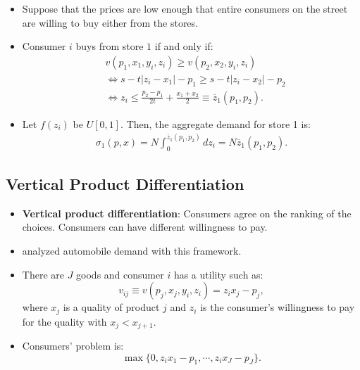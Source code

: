 \documentclass[
]{book}
\providecommand{\tightlist}{%
  \setlength{\itemsep}{0pt}\setlength{\parskip}{0pt}}
\begin{document}
\begin{itemize}
\tightlist
\item
  Suppose that the prices are low enough that entire consumers on the street are willing to buy either from the stores.
\item
  Consumer \(i\) buys from store \(1\) if and only if:
  \begin{equation}
  \begin{split}
  &v(p_1, x_1, y_i, z_i) \ge v(p_2, x_2, y_i, z_i)\\
  &\Leftrightarrow s - t |z_i - x_1| - p_1 \ge s - t |z_i - x_2|- p_2\\
  &\Leftrightarrow z_i \le \frac{p_2 - p_1}{2 t} + \frac{x_1 + x_2}{2} \equiv \overline{z}_1(p_1, p_2).
  \end{split}
  \end{equation}
\item
  Let \(f(z_i)\) be \(U[0, 1]\). Then, the aggregate demand for store 1 is:
  \begin{equation}
  \begin{split}
  \sigma_1(p, x) = N \int_{0}^{\overline{z}_1(p_1, p_2)} d z_i = N\overline{z}_1(p_1, p_2).
  \end{split}
  \end{equation}
\end{itemize}

\hypertarget{vertical-product-differentiation}{%
\subsection{Vertical Product Differentiation}\label{vertical-product-differentiation}}

\begin{itemize}
\tightlist
\item
  \textbf{Vertical product differentiation}: Consumers agree on the ranking of the choices. Consumers can have different willingness to pay.
\item
  \citet{Bresnahan1987} analyzed automobile demand with this framework.
\item
  There are \(J\) goods and consumer \(i\) has a utility such as:
  \begin{equation}
  v_{ij} \equiv v(p_j, x_j, y_i, z_i) = z_i x_j - p_j,
  \end{equation}
  where \(x_j\) is a quality of product \(j\) and \(z_i\) is the consumer's willingness to pay for the quality with \(x_j < x_{j + 1}\).
\item
  Consumers' problem is:
  \begin{equation}
  \max\{0, z_i x_1 - p_1, \cdots, z_i x_J - p_J \}.
  \end{equation}
\end{itemize}
\end{document}
